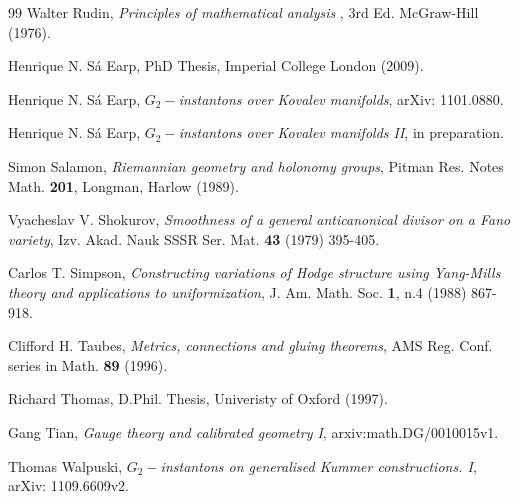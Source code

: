 \documentclass{article}
\begin{document}
\begin{thebibliography}{99}
 Walter Rudin, \emph{Principles of mathematical analysis}%
, 3rd Ed. McGraw-Hill (1976).

 Henrique N. S\'a Earp, PhD Thesis, Imperial College London (2009).

 Henrique N. S\'a Earp, \emph{$G_2-$instantons over Kovalev manifolds}, arXiv: 1101.0880.

 Henrique N. S\'a Earp, \emph{$G_2-$instantons over Kovalev manifolds II}, in preparation.

 Simon Salamon, \emph{Riemannian geometry and holonomy
groups}, Pitman Res. Notes Math. \textbf{201}, Longman, Harlow (1989).

 Vyacheslav V. Shokurov, \emph{Smoothness of a general anticanonical divisor on a Fano variety}, Izv. Akad. Nauk SSSR Ser. Mat. \textbf{43} (1979) 395-405.

 Carlos T. Simpson, \emph{Constructing variations of
Hodge structure using Yang-Mills theory and applications to uniformization},
J. Am. Math. Soc. \textbf{1}, n.4 (1988) 867-918.

 Clifford H. Taubes, \emph{Metrics, connections and gluing theorems}, AMS Reg. Conf. series in Math. \textbf{89} (1996).

 Richard Thomas, D.Phil. Thesis, Univeristy of Oxford
(1997).

 Gang Tian, \emph{Gauge theory and calibrated geometry I}, arxiv:math.DG/0010015v1.

 Thomas Walpuski, \emph{$G_2-$instantons on generalised Kummer constructions. I}, arXiv: 1109.6609v2.

\end{thebibliography}
\end{document}
